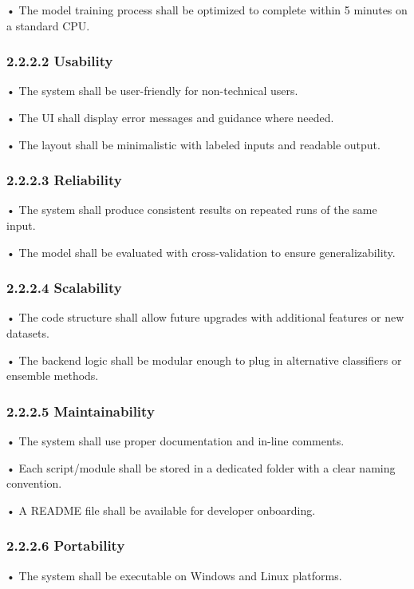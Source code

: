 \documentclass[11pt,a4paper]{article}
\begin{document}
• 
The model training process shall be optimized to complete within 5 minutes on a standard CPU. 

\subsubsection*{2.2.2.2 Usability }

• 
The system shall be user-friendly for non-technical users. 

• 
The UI shall display error messages and guidance where needed. 

• 
The layout shall be minimalistic with labeled inputs and readable output. 

\subsubsection*{2.2.2.3 Reliability }

• 
The system shall produce consistent results on repeated runs of the same input. 

• 
The model shall be evaluated with cross-validation to ensure generalizability. 

\subsubsection*{2.2.2.4 Scalability }

• 
The code structure shall allow future upgrades with additional features or new datasets. 

• 
The backend logic shall be modular enough to plug in alternative classifiers or ensemble methods. 

\subsubsection*{2.2.2.5 Maintainability }

• 
The system shall use proper documentation and in-line comments. 

• 
Each script/module shall be stored in a dedicated folder with a clear naming convention. 

• 
A README file shall be available for developer onboarding. 

\subsubsection*{2.2.2.6 Portability }

• 
The system shall be executable on Windows and Linux platforms. 
\end{document}
